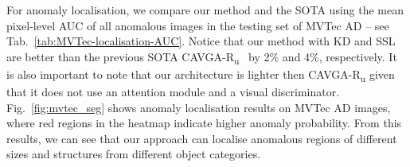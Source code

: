 \documentclass[final]{cvpr}
\begin{document}
\bgroup
\def\arraystretch{1}
\begin{table}
\centering
\small
{}
\caption{\textbf{Anomaly localisation:} mean pixel-level AUC results on the anomalous images of MVTec AD. Best result in \textcolor{red}{\textbf{red}} and second best in \textcolor{blue}{\textbf{blue}}.}
\vspace{-.18in}
\label{tab:MVTec-localisation-AUC}
\end{table}

For anomaly localisation, we compare our method and the SOTA using the mean pixel-level AUC of all anomalous images in the testing set of MVTec AD -- see Tab.~\ref{tab:MVTec-localisation-AUC}. Notice that our method with KD and SSL are better than the previous SOTA CAVGA-R\textsubscript{u}~\cite{venkataramanan2019attention} by 2\% and 4\%, respectively.
It is also important to note that our architecture is lighter then CAVGA-R\textsubscript{u} given that it does not use an attention module and a visual discriminator.  Fig.~\ref{fig:mvtec_seg} shows anomaly localisation results on MVTec AD images, where red regions in the heatmap indicate higher anomaly probability. From this results, we can see that our approach can localise anomalous regions of different sizes and structures from different object categories.
\end{document}
